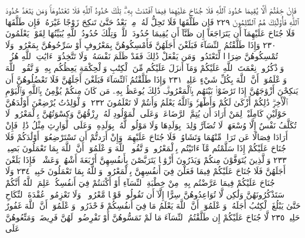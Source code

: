 فَإِنْ خِفْتُمْ أَلَّا يُقِيمَا حُدُودَ ٱللَّهِ فَلَا جُنَاحَ عَلَيْهِمَا فِيمَا ٱفْتَدَتْ
بِهِۦۗ تِلْكَ حُدُودُ ٱللَّهِ فَلَا تَعْتَدُوهَاۚ وَمَن يَتَعَدَّ حُدُودَ ٱللَّهِ فَأُو۟لَٰٓئِكَ
هُمُ ٱلظَّٰلِمُونَ ٢٢٩ فَإِن طَلَّقَهَا فَلَا تَحِلُّ لَهُۥ مِنۢ بَعْدُ حَتَّىٰ تَنكِحَ زَوْجًا
غَيْرَهُۥۗ فَإِن طَلَّقَهَا فَلَا جُنَاحَ عَلَيْهِمَآ أَن يَتَرَاجَعَآ إِن ظَنَّآ أَن
يُقِيمَا حُدُودَ ٱللَّهِۗ وَتِلْكَ حُدُودُ ٱللَّهِ يُبَيِّنُهَا لِقَوْمࣲ يَعْلَمُونَ ٢٣٠
وَإِذَا طَلَّقْتُمُ ٱلنِّسَآءَ فَبَلَغْنَ أَجَلَهُنَّ فَأَمْسِكُوهُنَّ بِمَعْرُوفٍ
أَوْ سَرِّحُوهُنَّ بِمَعْرُوفࣲۚ وَلَا تُمْسِكُوهُنَّ ضِرَارࣰا لِّتَعْتَدُوا۟ۚ وَمَن
يَفْعَلْ ذَٰلِكَ فَقَدْ ظَلَمَ نَفْسَهُۥۚ وَلَا تَتَّخِذُوٓا۟ ءَايَٰتِ ٱللَّهِ هُزُوࣰاۚ
وَٱذْكُرُوا۟ نِعْمَتَ ٱللَّهِ عَلَيْكُمْ وَمَآ أَنزَلَ عَلَيْكُم مِّنَ ٱلْكِتَٰبِ وَٱلْحِكْمَةِ
يَعِظُكُم بِهِۦۚ وَٱتَّقُوا۟ ٱللَّهَ وَٱعْلَمُوٓا۟ أَنَّ ٱللَّهَ بِكُلِّ شَيْءٍ عَلِيمࣱ ٢٣١ وَإِذَا
طَلَّقْتُمُ ٱلنِّسَآءَ فَبَلَغْنَ أَجَلَهُنَّ فَلَا تَعْضُلُوهُنَّ أَن يَنكِحْنَ
أَزْوَٰجَهُنَّ إِذَا تَرَٰضَوْا۟ بَيْنَهُم بِٱلْمَعْرُوفِۗ ذَٰلِكَ يُوعَظُ بِهِۦ مَن كَانَ
مِنكُمْ يُؤْمِنُ بِٱللَّهِ وَٱلْيَوْمِ ٱلْأٓخِرِۗ ذَٰلِكُمْ أَزْكَىٰ لَكُمْ وَأَطْهَرُۚ وَٱللَّهُ
يَعْلَمُ وَأَنتُمْ لَا تَعْلَمُونَ ٢٣٢۞ وَٱلْوَٰلِدَٰتُ يُرْضِعْنَ أَوْلَٰدَهُنَّ حَوْلَيْنِ
كَامِلَيْنِۖ لِمَنْ أَرَادَ أَن يُتِمَّ ٱلرَّضَاعَةَۚ وَعَلَى ٱلْمَوْلُودِ لَهُۥ رِزْقُهُنَّ
وَكِسْوَتُهُنَّ بِٱلْمَعْرُوفِۚ لَا تُكَلَّفُ نَفْسٌ إِلَّا وُسْعَهَاۚ لَا تُضَآرَّ
وَٰلِدَةُۢ بِوَلَدِهَا وَلَا مَوْلُودࣱ لَّهُۥ بِوَلَدِهِۦۚ وَعَلَى ٱلْوَارِثِ مِثْلُ ذَٰلِكَۗ فَإِنْ
أَرَادَا فِصَالًا عَن تَرَاضࣲ مِّنْهُمَا وَتَشَاوُرࣲ فَلَا جُنَاحَ عَلَيْهِمَاۗ وَإِنْ
أَرَدتُّمْ أَن تَسْتَرْضِعُوٓا۟ أَوْلَٰدَكُمْ فَلَا جُنَاحَ عَلَيْكُمْ إِذَا سَلَّمْتُم مَّآ
ءَاتَيْتُم بِٱلْمَعْرُوفِۗ وَٱتَّقُوا۟ ٱللَّهَ وَٱعْلَمُوٓا۟ أَنَّ ٱللَّهَ بِمَا تَعْمَلُونَ بَصِيرࣱ ٢٣٣
وَٱلَّذِينَ يُتَوَفَّوْنَ مِنكُمْ وَيَذَرُونَ أَزْوَٰجࣰا يَتَرَبَّصْنَ بِأَنفُسِهِنَّ
أَرْبَعَةَ أَشْهُرࣲ وَعَشْرࣰاۖ فَإِذَا بَلَغْنَ أَجَلَهُنَّ فَلَا جُنَاحَ عَلَيْكُمْ
فِيمَا فَعَلْنَ فِيٓ أَنفُسِهِنَّ بِٱلْمَعْرُوفِۗ وَٱللَّهُ بِمَا تَعْمَلُونَ خَبِيرࣱ ٢٣٤
وَلَا جُنَاحَ عَلَيْكُمْ فِيمَا عَرَّضْتُم بِهِۦ مِنْ خِطْبَةِ ٱلنِّسَآءِ
أَوْ أَكْنَنتُمْ فِيٓ أَنفُسِكُمْۚ عَلِمَ ٱللَّهُ أَنَّكُمْ سَتَذْكُرُونَهُنَّ
وَلَٰكِن لَّا تُوَاعِدُوهُنَّ سِرًّا إِلَّآ أَن تَقُولُوا۟ قَوْلࣰا مَّعْرُوفࣰاۚ
وَلَا تَعْزِمُوا۟ عُقْدَةَ ٱلنِّكَاحِ حَتَّىٰ يَبْلُغَ ٱلْكِتَٰبُ أَجَلَهُۥۚ
وَٱعْلَمُوٓا۟ أَنَّ ٱللَّهَ يَعْلَمُ مَا فِيٓ أَنفُسِكُمْ فَٱحْذَرُوهُۚ وَٱعْلَمُوٓا۟
أَنَّ ٱللَّهَ غَفُورٌ حَلِيمࣱ ٢٣٥ لَّا جُنَاحَ عَلَيْكُمْ إِن طَلَّقْتُمُ ٱلنِّسَآءَ
مَا لَمْ تَمَسُّوهُنَّ أَوْ تَفْرِضُوا۟ لَهُنَّ فَرِيضَةࣰۚ وَمَتِّعُوهُنَّ عَلَى

